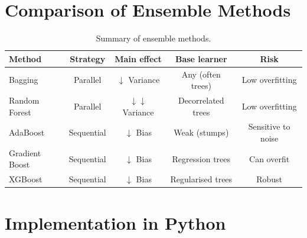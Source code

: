 \section{Comparison of Ensemble Methods}

\begin{table}[ht]
\centering
\caption{Summary of ensemble methods.}
\label{tab:ensemble-comparison}
\begin{tabular}{lcccc}
\toprule
\textbf{Method} & \textbf{Strategy} & \textbf{Main effect} & \textbf{Base learner} & \textbf{Risk} \\
\midrule
Bagging        & Parallel  & $\downarrow$ Variance & Any (often trees) & Low overfitting \\
Random Forest  & Parallel  & $\downarrow\downarrow$ Variance & Decorrelated trees & Low overfitting \\
AdaBoost       & Sequential & $\downarrow$ Bias     & Weak (stumps)     & Sensitive to noise \\
Gradient Boost & Sequential & $\downarrow$ Bias     & Regression trees  & Can overfit \\
XGBoost        & Sequential & $\downarrow$ Bias     & Regularised trees & Robust \\
\bottomrule
\end{tabular}
\end{table}

\section{Implementation in Python}

